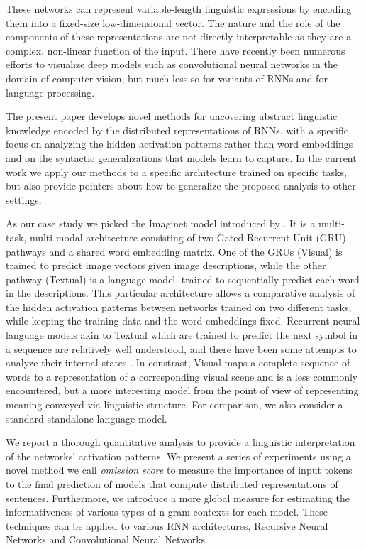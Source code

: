 These networks can represent variable-length linguistic expressions by
encoding them into a fixed-size low-dimensional vector. The nature and
the role of the components of these representations are not directly
interpretable as they are a complex, non-linear function of the
input. There have recently been numerous efforts to visualize deep
models such as convolutional neural networks in the domain of computer
vision, but much less so for variants of RNNs and for language
processing.

The present paper develops novel methods for uncovering abstract
linguistic knowledge encoded by the distributed representations of RNNs,
with a specific focus on analyzing the hidden activation patterns rather
than word embeddings and on the syntactic generalizations
that models learn to capture. In the current work we apply our methods
to a specific architecture trained on specific tasks, but also provide
pointers about how to generalize the proposed analysis to other settings.

As our case study we picked the {\sc Imaginet} model introduced by \label{explainimaginet}
\citep{chrupala2015learning}. It is a multi-task, multi-modal
architecture consisting of two Gated-Recurrent Unit (GRU)
\cite{cho2014properties,chung2014empirical} pathways and
a shared word embedding matrix. One of the GRUs ({\sc Visual}) is
trained to predict image vectors given image descriptions, while the other
pathway ({\sc Textual}) is a language model, trained to sequentially predict each
word in the descriptions. This particular
architecture allows a comparative analysis of the hidden activation
patterns between networks trained on two different tasks, while
keeping the training data and the word embeddings fixed. Recurrent neural
language models akin to {\sc Textual} which are trained to predict the
next symbol in a sequence are relatively well understood, and there
have been some attempts to analyze their internal states
\cite[among others]{elman1991distributed,karpathy2015visualizing}. In
constrast, {\sc Visual} maps a complete sequence of words to
a representation of a corresponding visual scene and is a less
commonly encountered, but a more interesting model from the point of
view of representing meaning conveyed via linguistic structure.
For comparison, we also consider a standard standalone language model.

We report a thorough quantitative analysis to provide a linguistic
interpretation of the networks' activation patterns. We present a
series of experiments using a novel method we call \emph{omission score}
to measure the importance of input tokens to the final prediction of models
that compute distributed representations of sentences.
Furthermore, we introduce a more global measure for estimating the
informativeness of various types of n-gram contexts for each model.
These techniques can be applied to various RNN architectures, Recursive
Neural Networks and Convolutional Neural Networks.

